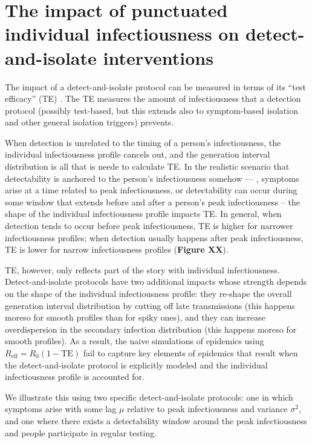 \clearpage

\section{The impact of punctuated individual infectiousness on detect-and-isolate interventions}

The impact of a detect-and-isolate protocol can be measured in terms of its ``test efficacy'' (TE) \citep{middleton_modeling_2024}.  The TE measures the amount of infectiousness that a detection protocol (possibly test-based, but this extends also to symptom-based isolation and other general isolation triggers) prevents. 

When detection is unrelated to the timing of a person's infectiousness, the individual infectiousness profile cancels out, and the generation interval distribution is all that is neede to calculate TE. In the realistic scenario that detectability is anchored to the person's infectiousness somehow --- \eg, symptoms arise at a time related to peak infectiousness, or detectability can occur during some window that extends before and after a person's peak infectiousness -- the shape of the individual infectiousness profile impacts TE. In general, when detection tends to occur before peak infectiousness, TE is higher for narrower infectiousness profiles; when detection usually happens after peak infectiousness, TE is lower for narrow infectiousness profiles ({\bf Figure XX}). 

TE, however, only reflects part of the story with individual infectiousness. Detect-and-isolate protocols have two additional impacts whose strength depends on the shape of the individual infectiousness profile: they re-shape the overall generation interval distribution by cutting off late transmissions (this happens moreso for smooth profiles than for spiky ones), and they can increase overdispersion in the secondary infection distribution (this happens moreso for smooth profiles). As a result, the naive simulations of epidemics using $R_{\text{eff}} = R_0 (1-\text{TE})$ fail to capture key elements of epidemics that result when the detect-and-isolate protocol is explicitly modeled and the individual infectiousness profile is accounted for. 

We illustrate this using two specific detect-and-isolate protocols: one in which symptoms arise with some lag $\mu$ relative to peak infectiousness and variance $\sigma^2$, and one where there exists a detectability window around the peak infectiousness and people participate in regular testing. 

